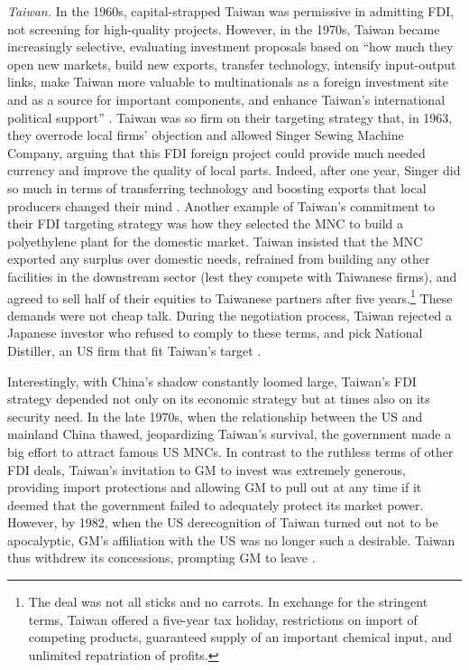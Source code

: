 \textit{Taiwan.} In the 1960s, capital-strapped Taiwan was permissive in
admitting FDI, not screening for high-quality projects. However, in the 1970s,
Taiwan became increasingly selective, evaluating investment proposals based on
``how much they open new markets, build new exports, transfer technology,
intensify input-output links, make Taiwan more valuable to multinationals as a
foreign investment site and as a source for important components, and enhance
Taiwan's international political support'' \citep[151]{Wade1990}. Taiwan was so
firm on their targeting strategy that, in 1963, they overrode local firms'
objection and allowed Singer Sewing Machine Company, arguing that this FDI
foreign project could provide much needed currency and improve the quality of
local parts. Indeed, after one year, Singer did so much in terms of transferring
technology and boosting exports that local producers changed their mind
\citep{Ranis1985}. Another example of Taiwan's commitment to their FDI targeting
strategy was how they selected the MNC to build a polyethylene plant for the
domestic market. Taiwan insisted that the MNC exported any surplus over domestic
needs, refrained from building any other facilities in the downstream sector
(lest they compete with Taiwanese firms), and agreed to sell half of their
equities to Taiwanese partners after five years.\footnote{The deal was not all
  sticks and no carrots. In exchange for the stringent terms, Taiwan offered a
  five-year tax holiday, restrictions on import of competing products,
  guaranteed supply of an important chemical input, and unlimited repatriation
  of profits.} These demands were not cheap talk. During the negotiation
process, Taiwan rejected a Japanese investor who refused to comply to these
terms, and pick National Distiller, an US firm that fit Taiwan's target
\citep[151]{Wade1990}.

Interestingly, with China's shadow constantly loomed large, Taiwan's FDI
strategy depended not only on its economic strategy but at times also on its
security need. In the late 1970s, when the relationship between the US and
mainland China thawed, jeopardizing Taiwan's survival, the government made a big
effort to attract famous US MNCs. In contrast to the ruthless terms of other FDI
deals, Taiwan's invitation to GM to invest was extremely generous, providing
import protections and allowing GM to pull out at any time if it deemed that the
government failed to adequately protect its market power. However, by 1982, when
the US derecognition of Taiwan turned out not to be apocalyptic, GM's
affiliation with the US was no longer such a desirable. Taiwan thus
withdrew its concessions, prompting GM to leave \citep{Noble1987}.

